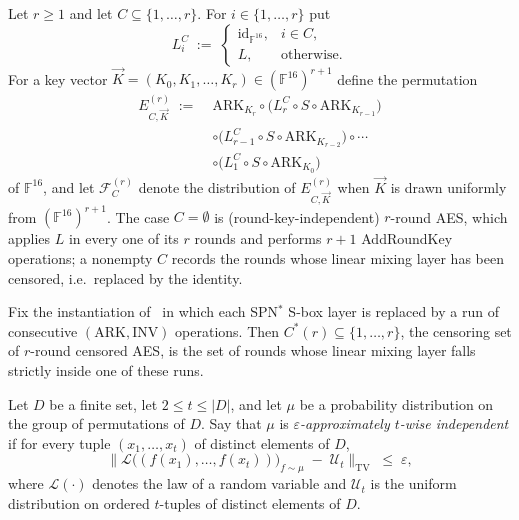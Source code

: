 \documentclass{aicr-conjecture}
\newcommand{\FF}{\mathbb{F}}
\newcommand{\ARK}{\mathrm{ARK}}
\newcommand{\INV}{\mathrm{INV}}
\newcommand{\TV}{\mathrm{TV}}
\newcommand{\id}{\mathrm{id}}
\newcommand{\Fd}{\mathcal{F}}
\newcommand{\vK}{\vec{K}}
\begin{document}
\begin{definition}\label{def:censored}
Let $r \ge 1$ and let $C \subseteq \{1,\dots,r\}$. For
$i \in \{1,\dots,r\}$ put
\[
  L^{C}_{i} \;:=\;
  \begin{cases}
    \id_{\FF^{16}}, & i \in C,\\[2pt]
    L, & \text{otherwise.}
  \end{cases}
\]
For a key vector $\vK = (K_0, K_1, \dots, K_r) \in (\FF^{16})^{r+1}$
define the permutation
\begin{align*}
  E^{(r)}_{C,\vK} \;:=\;
  & \ARK_{K_r} \circ
    \bigl( L^{C}_{r} \circ S \circ \ARK_{K_{r-1}} \bigr)\\
  & \circ \bigl( L^{C}_{r-1} \circ S \circ \ARK_{K_{r-2}} \bigr)
    \circ \cdots\\
  & \circ \bigl( L^{C}_{1} \circ S \circ \ARK_{K_{0}} \bigr)
\end{align*}
of $\FF^{16}$, and let $\Fd^{(r)}_{C}$ denote the distribution of
$E^{(r)}_{C,\vK}$ when $\vK$ is drawn uniformly from $(\FF^{16})^{r+1}$.
The case $C = \emptyset$ is (round-key-independent) $r$-round AES, which
applies $L$ in every one of its $r$ rounds and performs $r+1$ AddRoundKey
operations; a nonempty $C$ records the rounds whose linear mixing layer has
been censored, i.e.\ replaced by the identity.
\end{definition}

\begin{definition}\label{def:cstar}
Fix the instantiation of~\cite{LPTV23} in which each SPN$^{*}$ S-box layer
is replaced by a run of consecutive $(\ARK, \INV)$ operations. Then
$C^{*}(r) \subseteq \{1,\dots,r\}$, the censoring set of $r$-round censored
AES, is the set of rounds whose linear mixing layer falls strictly inside
one of these runs.
\end{definition}

\begin{definition}
\label{def:twise}
Let $D$ be a finite set, let $2 \le t \le |D|$, and let $\mu$ be a
probability distribution on the group of permutations of $D$. Say that
$\mu$ is \emph{$\varepsilon$-approximately $t$-wise independent} if for
every tuple $(x_1,\dots,x_t)$ of distinct elements of $D$,
\[
  \bigl\| \mathcal{L}\bigl( (f(x_1),\dots,f(x_t)) \bigr)_{f \sim \mu}
  \;-\; \mathcal{U}_t \bigr\|_{\TV} \;\le\; \varepsilon,
\]
where $\mathcal{L}(\cdot)$ denotes the law of a random variable and
$\mathcal{U}_t$ is the uniform distribution on ordered $t$-tuples of
distinct elements of $D$.
\end{definition}
\end{document}
